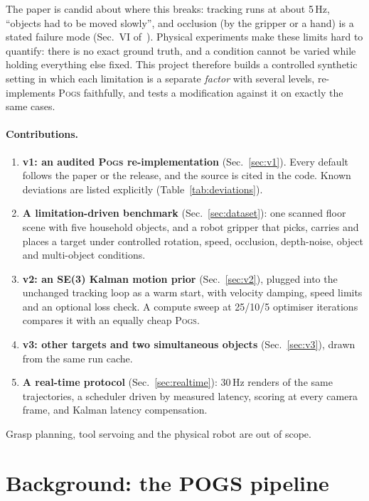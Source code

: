 \documentclass[10pt,a4paper]{article}
\newcommand{\pogs}{\textsc{Pogs}}
\begin{document}
The paper is candid about where this breaks: tracking runs at about 5\,Hz,
``objects had to be moved slowly'', and occlusion (by the gripper or a hand)
is a stated failure mode (Sec.~VI of~\cite{pogs}). Physical experiments make
these limits hard to quantify: there is no exact ground truth, and a condition
cannot be varied while holding everything else fixed. This project therefore
builds a controlled synthetic setting in which each limitation is a separate
\emph{factor} with several levels, re-implements \pogs{} faithfully, and tests
a modification against it on exactly the same cases.

\paragraph{Contributions.}
\begin{enumerate}
  \item \textbf{v1: an audited \pogs{} re-implementation} (Sec.~\ref{sec:v1}).
        Every default follows the paper or the release, and the source is cited
        in the code. Known deviations are listed explicitly (Table~\ref{tab:deviations}).
  \item \textbf{A limitation-driven benchmark} (Sec.~\ref{sec:dataset}): one
        scanned floor scene with five household objects, and a robot gripper that picks,
        carries and places a target under controlled rotation, speed,
        occlusion, depth-noise, object and multi-object conditions.
  \item \textbf{v2: an SE(3) Kalman motion prior} (Sec.~\ref{sec:v2}), plugged
        into the unchanged tracking loop as a warm start, with velocity damping,
        speed limits and an optional loss check. A compute sweep at 25/10/5
        optimiser iterations compares it with an equally cheap \pogs{}.
  \item \textbf{v3: other targets and two simultaneous objects}
        (Sec.~\ref{sec:v3}), drawn from the same run cache.
  \item \textbf{A real-time protocol} (Sec.~\ref{sec:realtime}): 30\,Hz renders of
        the same trajectories, a scheduler driven by measured latency, scoring
        at every camera frame, and Kalman latency compensation.
\end{enumerate}
Grasp planning, tool servoing and the physical robot are out of scope.

\section{Background: the POGS pipeline}
\label{sec:background}
\end{document}
